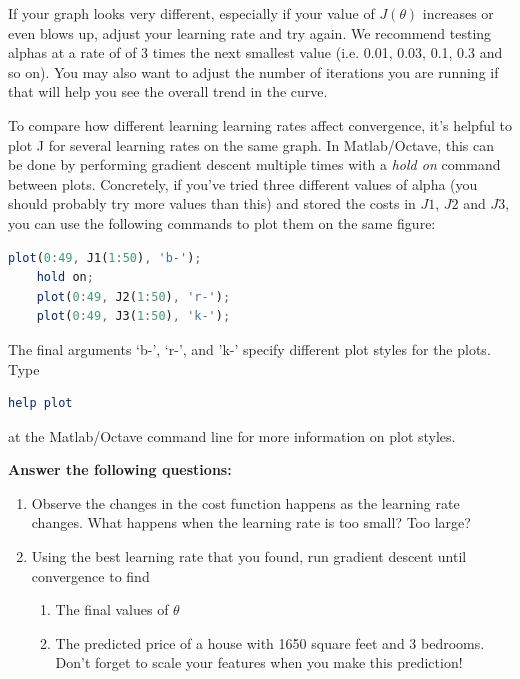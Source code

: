 \documentclass[10pt,a4paper]{article}
\begin{document}
  If your graph looks very different, especially if your value of $J(\theta)$ increases or even blows up, adjust your learning rate and try again. We recommend testing alphas at a rate of of 3 times the next smallest value (i.e. 0.01, 0.03, 0.1, 0.3 and so on). You may also want to adjust the number of iterations you are running if that will help you see the overall trend in the curve.

  To compare how different learning learning rates affect convergence, it's helpful to plot J for several learning rates on the same graph. In Matlab/Octave, this can be done by performing gradient descent multiple times with a \textit{hold on} command between plots. Concretely, if you've tried three different values of alpha (you should probably try more values than this) and stored the costs in $J1$, $J2$ and $J3$, you can use the following commands to plot them on the same figure:
  \begin{lstlisting}[language=Octave, basicstyle=\footnotesize, showspaces=false]
    plot(0:49, J1(1:50), 'b-');
    hold on;
    plot(0:49, J2(1:50), 'r-');
    plot(0:49, J3(1:50), 'k-');
  \end{lstlisting}

  The final arguments `b-', `r-', and 'k-' specify different plot styles for the plots. Type
  \begin{lstlisting}[language=Octave, basicstyle=\footnotesize, showspaces=false]
    help plot
  \end{lstlisting}
  at the Matlab/Octave command line for more information on plot styles.

  \textbf{Answer the following questions:}
  \begin{enumerate}
    \item Observe the changes in the cost function happens as the learning rate changes. What happens when the learning rate is too small? Too large?
    \item Using the best learning rate that you found, run gradient descent until convergence to find
    \begin{enumerate}
      \item The final values of $\theta$
      \item The predicted price of a house with 1650 square feet and 3 bedrooms. Don't forget to scale your features when you make this prediction!
    \end{enumerate}
  \end{enumerate}
\end{document}
